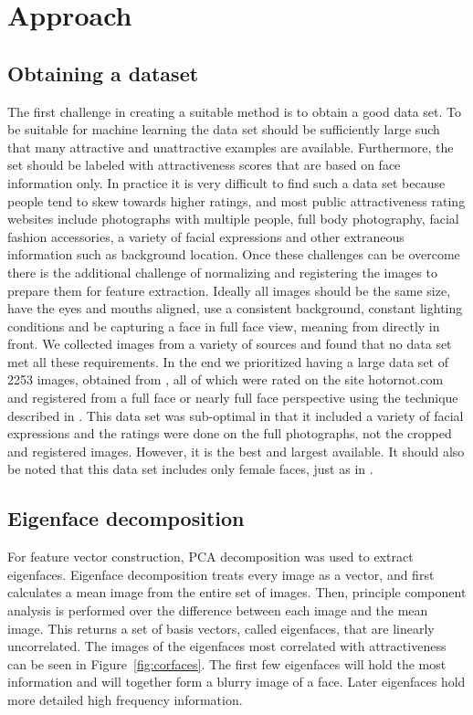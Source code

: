 \documentclass[10pt,twocolumn,letterpaper]{article}
\begin{document}
\section{Approach}

\subsection{Obtaining a dataset}
The first challenge in creating a suitable method is to obtain a good data set. To be suitable for machine learning the data set should be sufficiently large such that many attractive and unattractive examples are available. Furthermore, the set should be labeled with attractiveness scores that are based on face information only. In practice it is very difficult to find such a data set because people tend to skew towards higher ratings, and most public attractiveness rating websites include photographs with multiple people, full body photography, facial fashion accessories, a variety of facial expressions and other extraneous information such as background location. Once these challenges can be overcome there is the additional challenge of normalizing and registering the images to prepare them for feature extraction. Ideally all images should be the same size, have the eyes and mouths aligned, use a consistent background, constant lighting conditions and be capturing a face in full face view, meaning from directly in front. We collected images from a variety of sources and found that no data set met all these requirements. In the end we prioritized having a large data set of 2253 images, obtained from \cite{dataset}, all of which were rated on the site hotornot.com and registered from a full face or nearly full face perspective using the technique described in \cite{berg2004names}. This data set was sub-optimal in that it included a variety of facial expressions and the ratings were done on the full photographs, not the cropped and registered images. However, it is the best and largest available. It should also be noted that this data set includes only female faces, just as in \cite{eisenthal2006facial, kagian2006humanlike, kagian2008machine}.

\subsection{Eigenface decomposition}
For feature vector construction, PCA decomposition was used to extract eigenfaces. Eigenface decomposition treats every image as a vector, and first calculates a mean image from the entire set of images. Then, principle component analysis is performed over the difference between each image and the mean image. This returns a set of basis vectors, called eigenfaces, that are linearly uncorrelated. The images of the eigenfaces most correlated with attractiveness can be seen in Figure~\ref{fig:corfaces}. The first few eigenfaces will hold the most information and will together form a blurry image of a face. Later eigenfaces hold more detailed high frequency information.
\end{document}
